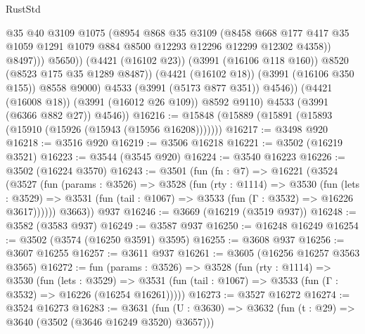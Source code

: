 \begin{lexlean}{RustStd}
\begin{coremodule}
                            @35
                            @40
                            @3109
                            @1075
                            (@8954
                              @868
                              @35
                              @3109
                              (@8458
                                @668
                                @177
                                @417
                                @35
                                @1059
                                @1291
                                @1079
                                @884
                                @8500
                                @12293
                                @12296
                                @12299
                                @12302
                                @4358))
                            @8497)))
                      @5650))
                  (@4421 (@16102 @23))
                  (@3991 (@16106 @118 @160))
                  @8520
                  (@8523 @175 @35 @1289 @8487))
                (@4421 (@16102 @18))
                (@3991 (@16106 @350 @155))
                @8558
                @9000)
              @4533
              (@3991 (@5173 @877 @351))
              @4546))
          (@4421 (@16008 @18))
          (@3991 (@16012 @26 @109))
          @8592
          @9110)
        @4533
        (@3991 (@6366 @882 @27))
        @4546))
@16216 := @15848 (@15889 (@15891 (@15893 (@15910 (@15926 (@15943 (@15956 @16208)))))))
@16217 := @3498 @920
@16218 := @3516 @920
@16219 := @3506 @16218
@16221 := @3502 (@16219 @3521)
@16223 := @3544 (@3545 @920)
@16224 := @3540 @16223
@16226 := @3502 (@16224 @3570)
@16243 := @3501
    (fun (fn : @7) =>
    @16221
      (@3524
        (@3527
          (fun (params : @3526) =>
          @3528
            (fun (rty : @1114) =>
            @3530
              (fun (lets : @3529) =>
              @3531 (fun (tail : @1067) => @3533 (fun (Γ : @3532) => @16226 @3617))))))
        @3663))
    @937
@16246 := @3669 (@16219 (@3519 @937))
@16248 := @3582 (@3583 @937)
@16249 := @3587 @937
@16250 := @16248 @16249
@16254 := @3502 (@3574 (@16250 @3591) @3595)
@16255 := @3608 @937
@16256 := @3607 @16255
@16257 := @3611 @937
@16261 := @3605 (@16256 @16257 @3563 @3565)
@16272 := fun (params : @3526) =>
  @3528
    (fun (rty : @1114) =>
    @3530
      (fun (lets : @3529) =>
      @3531 (fun (tail : @1067) => @3533 (fun (Γ : @3532) => @16226 (@16254 @16261)))))
@16273 := @3527 @16272
@16274 := @3524 @16273
@16283 := @3631
    (fun (U : @3630) => @3632 (fun (t : @29) => @3640 (@3502 (@3646 @16249 @3520) @3657)))

\end{coremodule}
\end{lexlean}

